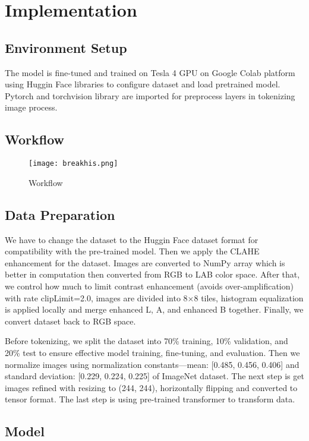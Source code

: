 \documentclass[twocolumn]{article}
\begin{document}
\section{Implementation}
\subsection{Environment Setup}
The model is fine-tuned and trained on Tesla 4 GPU on Google Colab platform using Huggin Face libraries to configure dataset and load pretrained model. Pytorch and torchvision library are imported for preprocess layers in tokenizing image process.

\subsection{Workflow}

\begin{figure}[H]
    \centering
    \texttt{[image: breakhis.png]}
    \caption{Workflow}
    \label{fig:enter-label}
\end{figure}

\subsection{Data Preparation}
We have to change the dataset to the Huggin Face dataset format for compatibility with the pre-trained model. Then we apply the CLAHE enhancement for the dataset. Images are converted to NumPy array which is better in computation then converted from RGB to LAB color space. After that, we control how much to limit contrast enhancement (avoids over-amplification) with rate clipLimit=2.0, images are divided into 8×8 tiles, histogram equalization is applied locally and merge enhanced L, A, and enhanced B together. Finally, we convert dataset back to RGB space.

Before tokenizing, we split the dataset into 70\% training, 10\% validation, and 20\% test to ensure effective model training, fine-tuning, and evaluation. Then we normalize images using normalization constants—mean: [0.485, 0.456, 0.406] and standard deviation: [0.229, 0.224, 0.225] of ImageNet dataset\cite{imagenet_cvpr09}. The next step is get images refined with resizing to (244, 244), horizontally flipping and converted to tensor format. The last step is using pre-trained transformer to transform data.

\subsection{Model}
\end{document}
